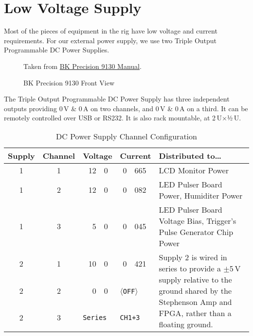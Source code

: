 
\chapter{Low Voltage Supply}
\label{chap:eq_low_voltage}

Most of the pieces of equipment in the rig have low voltage and current requirements.  For our external power supply, we use two  Triple Output Programmable DC Power Supplies.

\begin{figure}[htbp]
  \centering
  {\tiny Taken from \href{Manuals/9130_manual.pdf}{BK Precision 9130 Manual}. \\}
  \caption{BK Precision 9130 Front View}
  \label{fig:eq_low_voltage:bkprecision9130}
\end{figure}

The  Triple Output Programmable DC Power Supply has three independent outputs  providing 0\,V \& 0\,A on two channels, and 0\,V \& 0\,A on a third.  It can be remotely controlled over USB or RS232.  It is also rack mountable, at 2\,U$\times$½\,U.

\begin{table}[htbp]
  \centering
  \begin{tabular}{@{} c c r@{.}l@{\,V\quad} r@{.}l@{\,A\quad} p{}}
    \toprule %
    {Supply} & {Channel} & \multicolumn{2}{c}{Voltage} & \multicolumn{2}{c}{Current} & Distributed to\ldots \\
    \midrule %
    1&1 & 12&0 & 0&665 & LCD Monitor Power\\
    1&2 & 12&0 & 0&082 & LED Pulser Board Power,
                         Humiditer Power\\
    1&3 &  5&0 & 0&045 & LED Pulser Board Voltage Bias,
                         Trigger's Pulse Generator Chip Power\\
    2&1 & 10&0 & 0&421 & \multirow{3}{.5\textwidth}{Supply 2 is wired in series to
    provide a $\pm$5\,V supply relative to the ground shared by the Stephenson Amp and FPGA,
    rather than a floating ground.}\\
    2&2 &  0&0 & \multicolumn{2}{l}{〈\texttt{OFF}〉} 
                       & \\
    2&3 & \multicolumn{2}{l}{\texttt{Series}} & \multicolumn{2}{l}{\texttt{CH1+3}}
                       & \\
    \bottomrule %
  \end{tabular}
  \caption{DC Power Supply Channel Configuration}
  \label{tab:eq_low_voltage:external_settings}
\end{table}

